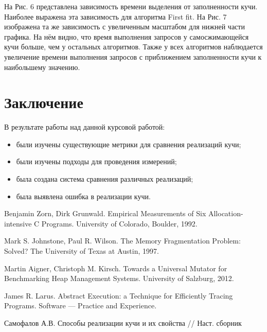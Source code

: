    На Рис. 6 представлена зависимость времени выделения от заполненности кучи. Наиболее выражена эта зависимость для алгоритма First fit. На Рис. 7 изображена та же
   зависимость с увеличенным масштабом для нижней части графика. На нём видно, что время выполнения запросов у самосжимающейся кучи больше, чем у остальных 
   алгоритмов. Также у всех алгоритмов наблюдается увеличение времени выполнения запросов с приближением заполненности кучи к наибольшему значению.
   
   
   \section{Заключение}
   
   В результате работы над данной курсовой работой:
   
    \begin{itemize}
     \item были изучены существующие метрики для сравнения реализаций кучи;
     \item были изучены подходы для проведения измерений;
     \item была создана система сравнения различных реализаций;
     \item была выявлена ошибка в реализации кучи.
    \end{itemize}

\begin{thebibliography}{99}
Benjamin Zorn, Dirk Grunwald.
Empirical Measurements of Six Allocation-intensive C Programs. University of Colorado, Boulder, 1992.

Mark S. Johnstone, Paul R. Wilson.
The Memory Fragmentation Problem: Solved? The University of Texas at Austin, 1997.

Martin Aigner, Christoph M. Kirsch. Towards a Universal Mutator for Benchmarking Heap Management Systems.
University of Salzburg, 2012.

James R. Larus. Abstract Execution: a Technique for Efficiently Tracing Programs.
Software --- Practice and Experience.

Самофалов А.В. Способы реализации кучи и их свойства // Наст. сборник
\end{thebibliography}
